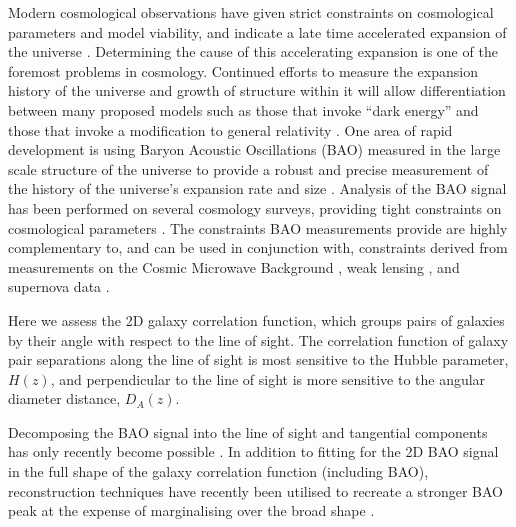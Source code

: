 \documentclass[a4paper,fleqn,usenatbib]{mnras}
\begin{document}
Modern cosmological observations have given strict constraints on cosmological parameters and model viability, and indicate a late time accelerated expansion of the universe \citep{RiessFilippenko1998, PerlmutterAldering1999, SpergelVerde2003, RiessStrolger2004, TegmarkBlanton2004, SanchezBaugh2006, SpergelBean2007, Komatsu2009, RiessMacri2009, PercivalReid2010, ReidPercival2010,BlakeKazin2011}. Determining the cause of this accelerating expansion is one of the foremost problems in cosmology.   Continued efforts to measure the expansion history of the universe and growth of structure within it will allow differentiation between many proposed models such as those that invoke ``dark energy'' and those that invoke a modification to general relativity \citep{SanchezScoccola2012}. One area of rapid development is using Baryon Acoustic Oscillations (BAO) measured in the large scale structure of the universe to provide a robust and precise measurement of the history of the universe's expansion rate and size \citep{EisensteinHu1998,BlakeGlazebrook2003,HuHaiman2003,Linder2003,SeoEisenstein2003}. Analysis of the BAO signal has been performed on several cosmology surveys, providing tight constraints on cosmological parameters \citep{Eisenstein2005,PercivalCole2007,Gaztanaga2009,PercivalReid2010,BlakeDavis2011,BlakeKazin2011, SanchezKazinBeutler2013, AndersonAubourg2014}. The constraints BAO measurements provide are highly complementary to, and can be used in conjunction with, constraints derived from measurements on the Cosmic Microwave Background  \citep[CMB;][]{BennettHalpern2003, Planck201416}, weak lensing \citep{VanWaerbeke2000,WittmanTyson2000,KaiserWilson2000}, and supernova data \citep{KowalskiRubin2008, KesslerBeckerCinabro2009, BetouleKessler2014}.


Here we assess the 2D galaxy correlation function, which groups pairs of galaxies by their angle with respect to the line of sight.  The correlation function of galaxy pair separations along the line of sight is most sensitive to the Hubble parameter, $H(z)$, and  perpendicular to the line of sight is more sensitive to the angular diameter distance, $D_A(z)$.  

Decomposing the BAO signal into the line of sight and tangential components has only recently become possible \citep{Gaztanaga2009, XuCuesta2013, AndersonAubourg2014DR11, AndersonAubourg2014}. In addition to fitting for the 2D BAO signal in the full shape of the galaxy correlation function (including BAO), reconstruction techniques have recently been utilised to recreate a stronger BAO peak at the expense of marginalising over the broad shape \citep{PadmanabhanXuEisenstein2012, KazinKoda2014}.
\end{document}
